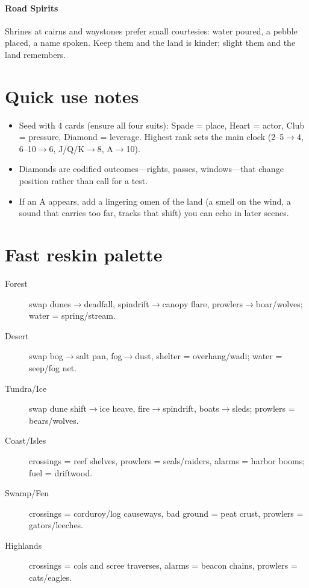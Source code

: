\paragraph{Road Spirits}
Shrines at cairns and waystones prefer small courtesies: water poured, a pebble placed, a name spoken. Keep them and the land is kinder; slight them and the land remembers.

\section*{Quick use notes}
\label{sec:wilderness-quick-use}
\begin{itemize}
\item Seed with 4 cards (ensure all four suits): Spade = place, Heart = actor, Club = pressure, Diamond = leverage. Highest rank sets the main clock (2--5$\rightarrow$4, 6--10$\rightarrow$6, J/Q/K$\rightarrow$8, A$\rightarrow$10).
\item Diamonds are codified outcomes---rights, passes, windows---that change position rather than call for a test.
\item If an A appears, add a lingering omen of the land (a smell on the wind, a sound that carries too far, tracks that shift) you can echo in later scenes.
\end{itemize}

\section*{Fast reskin palette}
\label{sec:wilderness-reskin}
\begin{description}
\item[Forest] swap dunes$\rightarrow$deadfall, spindrift$\rightarrow$canopy flare, prowlers$\rightarrow$boar/wolves; water = spring/stream.
\item[Desert] swap bog$\rightarrow$salt pan, fog$\rightarrow$dust, shelter = overhang/wadi; water = seep/fog net.
\item[Tundra/Ice] swap dune shift$\rightarrow$ice heave, fire$\rightarrow$spindrift, boats$\rightarrow$sleds; prowlers = bears/wolves.
\item[Coast/Isles] crossings = reef shelves, prowlers = seals/raiders, alarms = harbor booms; fuel = driftwood.
\item[Swamp/Fen] crossings = corduroy/log causeways, bad ground = peat crust, prowlers = gators/leeches.
\item[Highlands] crossings = cols and scree traverses, alarms = beacon chains, prowlers = cats/eagles.
\end{description}


